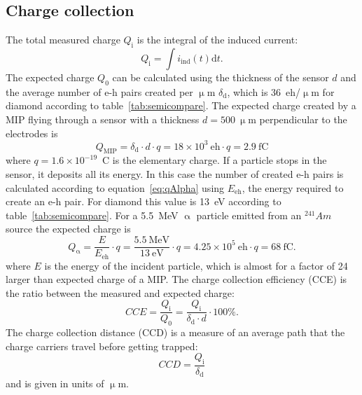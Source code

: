 \subsection{Charge collection}
The total measured charge $Q_\mathrm{i}$ is the integral of the induced current:
\begin{equation}
Q_\mathrm{i}=\int i_\mathrm{ind}(t) \mathrm{d}t.
\end{equation}
The expected charge $Q_\mathrm{0}$ can be calculated using the thickness of the sensor $d$ and the average number of e-h pairs created per $\upmu$m $\delta_\mathrm{d}$, which is 36~eh/$\upmu$m for diamond according to table~\ref{tab:semicompare}. 
The expected charge created by a MIP flying through a sensor with a thickness $d=500~\upmu$m perpendicular to the electrodes is
\begin{equation}
\label{eq:qBeta}
Q_\mathrm{MIP}=\delta_\mathrm{d}\cdot d \cdot q = 18\times10^3~\mathrm{eh} \cdot q = 2.9~\mathrm{fC}
\end{equation}
where $q=1.6\times10^{-19}$~C is the elementary charge.
If a particle stops in the sensor, it deposits all its energy. In this case the number of created e-h pairs is calculated according to equation~\ref{eq:qAlpha} using $E_\mathrm{eh}$, the energy required to create an e-h pair. For diamond this value is 13~eV according to table~\ref{tab:semicompare}. For a 5.5~MeV $\upalpha$ particle emitted from an $^{241}Am$ source the expected charge is
\begin{equation}
\label{eq:qAlpha}
Q_\upalpha = \frac{E}{E_\mathrm{eh}} \cdot q = \frac{5.5~\mathrm{MeV}}{13~\mathrm{eV}} \cdot q = 4.25\times10^5~\mathrm{eh} \cdot q = 68~\mathrm{fC}.
\end{equation}
where $E$ is the energy of the incident particle, which is almost for a factor of 24 larger than expected charge of a MIP. The charge collection efficiency (CCE) is the ratio between the measured and expected charge:
\begin{equation}
\label{eq:ccecalc1}
CCE = \frac{Q_\mathrm{i}}{Q_\mathrm{0}} = \frac{Q_\mathrm{i}}{\delta_\mathrm{d}\cdot d}\cdot100\%.
\end{equation}
The charge collection distance (CCD) is a measure of an average path that the charge carriers travel before getting trapped:
\begin{equation}
\label{eq:ccdcalc1}
CCD = \frac{Q_\mathrm{i}}{\delta_\mathrm{d}}
\end{equation}
and is given in units of $\upmu$m.


